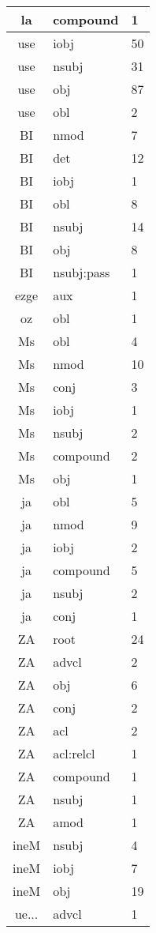 \documentclass[a4 paper]{article}
\begin{document}
\begin{longtable}{cp{}p{}}
la & compound & 1\\ \midrule 
use & iobj & 50\\ \midrule use & nsubj & 31\\ \midrule use & obj & 87\\ \midrule use & obl & 2\\ \midrule 
BI & nmod & 7\\ \midrule BI & det & 12\\ \midrule BI & iobj & 1\\ \midrule BI & obl & 8\\ \midrule BI & nsubj & 14\\ \midrule BI & obj & 8\\ \midrule BI & nsubj:pass & 1\\ \midrule 
ezge & aux & 1\\ \midrule 
oz & obl & 1\\ \midrule 
Ms & obl & 4\\ \midrule Ms & nmod & 10\\ \midrule Ms & conj & 3\\ \midrule Ms & iobj & 1\\ \midrule Ms & nsubj & 2\\ \midrule Ms & compound & 2\\ \midrule Ms & obj & 1\\ \midrule 
ja & obl & 5\\ \midrule ja & nmod & 9\\ \midrule ja & iobj & 2\\ \midrule ja & compound & 5\\ \midrule ja & nsubj & 2\\ \midrule ja & conj & 1\\ \midrule 
ZA & root & 24\\ \midrule ZA & advcl & 2\\ \midrule ZA & obj & 6\\ \midrule ZA & conj & 2\\ \midrule ZA & acl & 2\\ \midrule ZA & acl:relcl & 1\\ \midrule ZA & compound & 1\\ \midrule ZA & nsubj & 1\\ \midrule ZA & amod & 1\\ \midrule 
ineM & nsubj & 4\\ \midrule ineM & iobj & 7\\ \midrule ineM & obj & 19\\ \midrule 
ue... & advcl & 1\\ \midrule 

\end{longtable}
\end{document}
